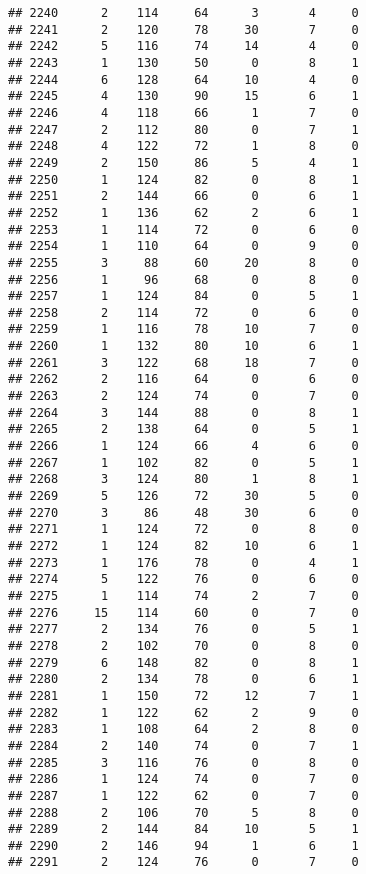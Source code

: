 \documentclass[
]{article}
\begin{document}
\begin{verbatim}
## 2240      2    114     64      3       4     0
## 2241      2    120     78     30       7     0
## 2242      5    116     74     14       4     0
## 2243      1    130     50      0       8     1
## 2244      6    128     64     10       4     0
## 2245      4    130     90     15       6     1
## 2246      4    118     66      1       7     0
## 2247      2    112     80      0       7     1
## 2248      4    122     72      1       8     0
## 2249      2    150     86      5       4     1
## 2250      1    124     82      0       8     1
## 2251      2    144     66      0       6     1
## 2252      1    136     62      2       6     1
## 2253      1    114     72      0       6     0
## 2254      1    110     64      0       9     0
## 2255      3     88     60     20       8     0
## 2256      1     96     68      0       8     0
## 2257      1    124     84      0       5     1
## 2258      2    114     72      0       6     0
## 2259      1    116     78     10       7     0
## 2260      1    132     80     10       6     1
## 2261      3    122     68     18       7     0
## 2262      2    116     64      0       6     0
## 2263      2    124     74      0       7     0
## 2264      3    144     88      0       8     1
## 2265      2    138     64      0       5     1
## 2266      1    124     66      4       6     0
## 2267      1    102     82      0       5     1
## 2268      3    124     80      1       8     1
## 2269      5    126     72     30       5     0
## 2270      3     86     48     30       6     0
## 2271      1    124     72      0       8     0
## 2272      1    124     82     10       6     1
## 2273      1    176     78      0       4     1
## 2274      5    122     76      0       6     0
## 2275      1    114     74      2       7     0
## 2276     15    114     60      0       7     0
## 2277      2    134     76      0       5     1
## 2278      2    102     70      0       8     0
## 2279      6    148     82      0       8     1
## 2280      2    134     78      0       6     1
## 2281      1    150     72     12       7     1
## 2282      1    122     62      2       9     0
## 2283      1    108     64      2       8     0
## 2284      2    140     74      0       7     1
## 2285      3    116     76      0       8     0
## 2286      1    124     74      0       7     0
## 2287      1    122     62      0       7     0
## 2288      2    106     70      5       8     0
## 2289      2    144     84     10       5     1
## 2290      2    146     94      1       6     1
## 2291      2    124     76      0       7     0

\end{verbatim}
\end{document}
